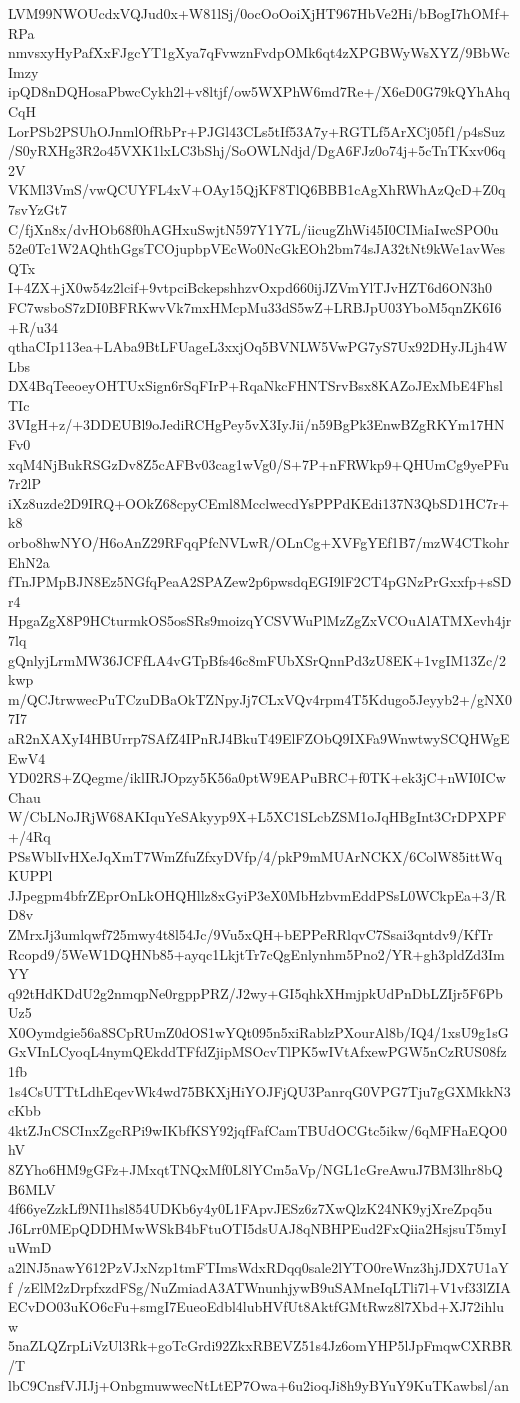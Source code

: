 LVM99NWOUcdxVQJud0x+W81lSj/0ocOoOoiXjHT967HbVe2Hi/bBogI7hOMf+RPa
nmvsxyHyPafXxFJgcYT1gXya7qFvwznFvdpOMk6qt4zXPGBWyWsXYZ/9BbWcImzy
ipQD8nDQHosaPbwcCykh2l+v8ltjf/ow5WXPhW6md7Re+/X6eD0G79kQYhAhqCqH
LorPSb2PSUhOJnmlOfRbPr+PJGl43CLs5tIf53A7y+RGTLf5ArXCj05f1/p4sSuz
/S0yRXHg3R2o45VXK1lxLC3bShj/SoOWLNdjd/DgA6FJz0o74j+5cTnTKxv06q2V
VKMl3VmS/vwQCUYFL4xV+OAy15QjKF8TlQ6BBB1cAgXhRWhAzQcD+Z0q7svYzGt7
C/fjXn8x/dvHOb68f0hAGHxuSwjtN597Y1Y7L/iicugZhWi45I0CIMiaIwcSPO0u
52e0Tc1W2AQhthGgsTCOjupbpVEcWo0NcGkEOh2bm74sJA32tNt9kWe1avWesQTx
I+4ZX+jX0w54z2lcif+9vtpciBckepshhzvOxpd660ijJZVmYlTJvHZT6d6ON3h0
FC7wsboS7zDI0BFRKwvVk7mxHMcpMu33dS5wZ+LRBJpU03YboM5qnZK6I6+R/u34
qthaCIp113ea+LAba9BtLFUageL3xxjOq5BVNLW5VwPG7yS7Ux92DHyJLjh4WLbs
DX4BqTeeoeyOHTUxSign6rSqFIrP+RqaNkcFHNTSrvBsx8KAZoJExMbE4FhslTIc
3VIgH+z/+3DDEUBl9oJediRCHgPey5vX3IyJii/n59BgPk3EnwBZgRKYm17HNFv0
xqM4NjBukRSGzDv8Z5cAFBv03cag1wVg0/S+7P+nFRWkp9+QHUmCg9yePFu7r2lP
iXz8uzde2D9IRQ+OOkZ68cpyCEml8McclwecdYsPPPdKEdi137N3QbSD1HC7r+k8
orbo8hwNYO/H6oAnZ29RFqqPfcNVLwR/OLnCg+XVFgYEf1B7/mzW4CTkohrEhN2a
fTnJPMpBJN8Ez5NGfqPeaA2SPAZew2p6pwsdqEGI9lF2CT4pGNzPrGxxfp+sSDr4
HpgaZgX8P9HCturmkOS5osSRs9moizqYCSVWuPlMzZgZxVCOuAlATMXevh4jr7lq
gQnlyjLrmMW36JCFfLA4vGTpBfs46c8mFUbXSrQnnPd3zU8EK+1vgIM13Zc/2kwp
m/QCJtrwwecPuTCzuDBaOkTZNpyJj7CLxVQv4rpm4T5Kdugo5Jeyyb2+/gNX07I7
aR2nXAXyI4HBUrrp7SAfZ4IPnRJ4BkuT49ElFZObQ9IXFa9WnwtwySCQHWgEEwV4
YD02RS+ZQegme/iklIRJOpzy5K56a0ptW9EAPuBRC+f0TK+ek3jC+nWI0ICwChau
W/CbLNoJRjW68AKIquYeSAkyyp9X+L5XC1SLcbZSM1oJqHBgInt3CrDPXPF+/4Rq
PSsWblIvHXeJqXmT7WmZfuZfxyDVfp/4/pkP9mMUArNCKX/6ColW85ittWqKUPPl
JJpegpm4bfrZEprOnLkOHQHllz8xGyiP3eX0MbHzbvmEddPSsL0WCkpEa+3/RD8v
ZMrxJj3umlqwf725mwy4t8l54Jc/9Vu5xQH+bEPPeRRlqvC7Ssai3qntdv9/KfTr
Rcopd9/5WeW1DQHNb85+ayqc1LkjtTr7cQgEnlynhm5Pno2/YR+gh3pldZd3ImYY
q92tHdKDdU2g2nmqpNe0rgppPRZ/J2wy+GI5qhkXHmjpkUdPnDbLZIjr5F6PbUz5
X0Oymdgie56a8SCpRUmZ0dOS1wYQt095n5xiRablzPXourAl8b/IQ4/1xsU9g1sG
GxVInLCyoqL4nymQEkddTFfdZjipMSOcvTlPK5wIVtAfxewPGW5nCzRUS08fz1fb
1s4CsUTTtLdhEqevWk4wd75BKXjHiYOJFjQU3PanrqG0VPG7Tju7gGXMkkN3cKbb
4ktZJnCSCInxZgcRPi9wIKbfKSY92jqfFafCamTBUdOCGtc5ikw/6qMFHaEQO0hV
8ZYho6HM9gGFz+JMxqtTNQxMf0L8lYCm5aVp/NGL1cGreAwuJ7BM3lhr8bQB6MLV
4f66yeZzkLf9NI1hsl854UDKb6y4y0L1FApvJESz6z7XwQlzK24NK9yjXreZpq5u
J6Lrr0MEpQDDHMwWSkB4bFtuOTI5dsUAJ8qNBHPEud2FxQiia2HsjsuT5myIuWmD
a2lNJ5nawY612PzVJxNzp1tmFTImsWdxRDqq0sale2lYTO0reWnz3hjJDX7U1aYf
/zElM2zDrpfxzdFSg/NuZmiadA3ATWnunhjywB9uSAMneIqLTli7l+V1vf33lZIA
ECvDO03uKO6cFu+smgI7EueoEdbl4lubHVfUt8AktfGMtRwz8l7Xbd+XJ72ihluw
5naZLQZrpLiVzUl3Rk+goTcGrdi92ZkxRBEVZ51s4Jz6omYHP5lJpFmqwCXRBR/T
lbC9CnsfVJIJj+OnbgmuwwecNtLtEP7Owa+6u2ioqJi8h9yBYuY9KuTKawbsl/an
